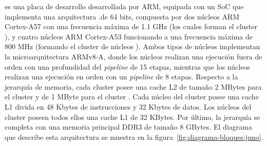 \junodp es una placa de desarrollo desarrollada por ARM, equipada con un
SoC que implementa una arquitectura \BIG.\LITTLE de 64 bits, compuesta por
dos núcleos ARM Cortex-A57 con una frecuencia máxima de 1.1 GHz (los cuales
forman el cluster \BIG), y cuatro núcleos ARM Cortex-A53 funcionando a una
frecuencia máxima de 800 MHz (formando el cluster de núcleos
\LITTLE). Ambos tipos de núcleos implementan la microarquitectura ARMv8-A,
donde los núcleos \BIG realizan una ejecución fuera de orden con una
profundidad del \emph{pipeline} de 15 etapas, mientras que los núcleos
\LITTLE realizan una ejecución en orden con un \emph{pipeline} de 8 etapas.
Respecto a la jerarquía de memoria, cada cluster posee una cache L2 de
tamaño 2 MBytes para el cluster \BIG y de 1 MByte para el cluster
\LITTLE. Cada núcleo del cluster \BIG posee una cache L1 divida en 48
Kbytes de instrucciones y 32 Kbytes de datos. Los núcleos del cluster
\LITTLE poseen todos ellos una cache L1 de 32 KBytes. Por último, la
jerarquía se completa con una memoria principal DDR3 de tamaño 8 GBytes.
El diagrama que describe esta arquitectura se muestra en la
figura~\ref{fig:diagrama-bloques:juno}.

